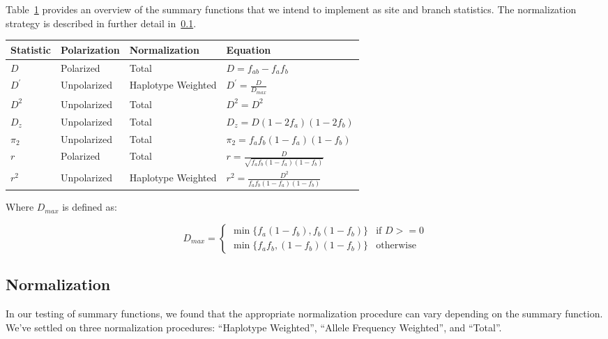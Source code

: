 \documentclass[12pt]{article}
\begin{document}
Table~\ref{table:summary_functions} provides an overview of the summary
functions that we intend to implement as site and branch statistics. The
normalization strategy is described in further detail in~\ref{section:normalization}.

\begin{table}[H]
  \begin{tabular}{llll} Statistic & Polarization & Normalization & Equation\\

    \hline $D$ & Polarized & Total & $D = f_{ab} - f_{a}f_{b}$ \\

    $D^{\prime}$ & Unpolarized & Haplotype Weighted & $D^{\prime} =
\frac{D}{D_{max}}$ \\

    $D^{2}$ & Unpolarized & Total & $D^{2} = D^{2}$ \\

    $D_{z}$ & Unpolarized & Total & $D_{z} = D (1 - 2 f_{a})(1-2f_{b})$ \\

    $\pi_{2}$ & Unpolarized & Total & $\pi_{2} = f_{a}f_{b}(1-f_{a})(1-f_{b})$
\\

    $r$ & Polarized & Total & $r =
\frac{D}{\sqrt{f_{a}f_{b}(1-f_{a})(1-f_{b})}}$ \\

    $r^{2}$ & Unpolarized & Haplotype Weighted & $r^{2} =
\frac{D^{2}}{f_{a}f_{b}(1-f_{a})(1-f_{b})}$ \\
  \end{tabular}
\label{table:summary_functions}
\end{table}
Where $D_{max}$ is defined as:

\[
  D_{max} = 
  \begin{cases}
    \min\{f_{a}(1-f_{b}),f_{b}(1-f_{b})\} & \text{if~}D>=0 \\
    \min\{f_{a}f_{b},(1-f_{b})(1-f_{b})\} & \text{otherwise}
  \end{cases}
\]

\subsection{Normalization} \label{section:normalization}
In our testing of summary functions, we found that the appropriate normalization
procedure can vary depending on the summary function. We've settled on three
normalization procedures: ``Haplotype Weighted'', ``Allele Frequency Weighted'',
and ``Total''.
\end{document}
